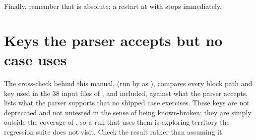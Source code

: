 Finally, remember that  is absolute: a restart at
 with  stops immediately.

\section{Keys the parser accepts but no case uses}
\label{sec:ref-numerics:unused}

The cross-check behind this manual,  (run by
 as ), compares every block path and key used in
the 38 input files of ,  and
 included, against what the parser accepts.  lists what the parser supports
that no shipped case exercises. These keys are not deprecated and not
untested in the sense of being known-broken; they are simply outside the
coverage of , so a run that uses them is exploring territory the
regression suite does not visit. Check the result rather than assuming it.

